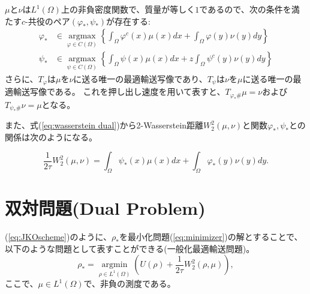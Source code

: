 \begin{thm}
    \label{thm:pushforward measure}
    $\mu$と$\nu$は$L^1(\Omega)$上の非負密度関数で、質量が等しく$1$であるので、次の条件を満たす$c$-共役のペア$(\varphi_*, \psi_*)$が存在する:
    \begin{align*}
        \varphi_* &\in \underset{\varphi \in C(\Omega)} {\operatorname{argmax}}\left\{\int_{\Omega} \varphi^c(x) \mu(x)dx + \int_{\Omega} \varphi(y) \nu(y)dy \right\} \\
        \psi_* &\in \underset{\psi \in C(\Omega)} {\operatorname{argmax}} \left\{\int_{\Omega} \psi(x) \mu(x)dx +z \int_{\Omega} \psi^c(y) \nu(y)dy \right\}
    \end{align*}
さらに、$T_\varphi$は$\mu$を$\nu$に送る唯一の最適輸送写像であり、$T_\psi$は$\nu$を$\mu$に送る唯一の最適輸送写像である。
これを押し出し速度を用いて表すと、$T_{\varphi_* \#} \mu = \nu$および$T_{\psi_* \#} \nu = \mu$となる。

また、式(\ref{eq:wasserstein dual})から2-Wasserstein距離$W^2_2(\mu, \nu)$と関数$\varphi_*, \psi_*$との関係は次のようになる。

\[
\frac{1}{2\tau}W^2_2(\mu, \nu) = \int_{\Omega} \psi_*(x) \mu(x)dx + \int_{\Omega} \varphi_*(y) \nu(y)dy.
\]
\end{thm}




\section{双対問題(Dual Problem)}
\label{sect:Dual Problem}
(\ref{eq:JKOscheme})のように、$\rho_*$を最小化問題(\ref{eq:minimizer})の解とすることで、以下のような問題として表すことができる(一般化最適輸送問題)。
\begin{equation}
    \label{eq: GOT}
        \rho_* = \underset{\rho \in L^1(\Omega)} {\operatorname{argmin}} \left( U(\rho) + \frac{1}{2 \tau}W_2^2(\rho, \mu) \right), 
\end{equation}
ここで、$\mu \in L^1(\Omega)$で、非負の測度である。

